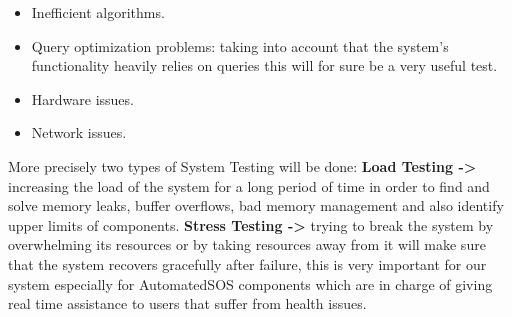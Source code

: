 \begin{itemize}
\item Inefficient algorithms.
\item Query optimization problems: taking into account that the system's functionality heavily relies on queries this will for sure be a very useful test.
\item Hardware issues.
\item Network issues.
\end{itemize}

\noindent
More precisely two types of System Testing will be done:
\medbreak
\noindent
\textbf{Load Testing ->} increasing the load of the system for a long period of time in order to find and solve memory leaks, buffer overflows, bad memory management and also identify upper limits of components.
\medbreak
\noindent
\textbf{Stress Testing ->} trying to break the system by overwhelming its resources or by taking resources away from it will make sure that the system recovers gracefully after failure, this is very important for our system especially for AutomatedSOS components which are in charge of giving real time assistance to users that suffer from health issues.



